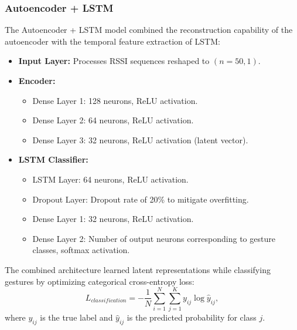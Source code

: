 \documentclass[10pt,twocolumn,letterpaper]{article}
\begin{document}
\subsubsection{Autoencoder + LSTM}
The Autoencoder + LSTM model combined the reconstruction capability of the autoencoder with the temporal feature extraction of LSTM:
\begin{itemize}
    \item \textbf{Input Layer:} Processes RSSI sequences reshaped to \((n=50, 1)\).
    \item \textbf{Encoder:}
        \begin{itemize}
            \item Dense Layer 1: 128 neurons, ReLU activation.
            \item Dense Layer 2: 64 neurons, ReLU activation.
            \item Dense Layer 3: 32 neurons, ReLU activation (latent vector).
        \end{itemize}
    \item \textbf{LSTM Classifier:}
        \begin{itemize}
            \item LSTM Layer: 64 neurons, ReLU activation.
            \item Dropout Layer: Dropout rate of 20\% to mitigate overfitting.
            \item Dense Layer 1: 32 neurons, ReLU activation.
            \item Dense Layer 2: Number of output neurons corresponding to gesture classes, softmax activation.
        \end{itemize}
\end{itemize}

The combined architecture learned latent representations while classifying gestures by optimizing categorical cross-entropy loss:
\begin{equation}
    L_{classification} = -\frac{1}{N} \sum_{i=1}^N \sum_{j=1}^K y_{ij} \log \hat{y}_{ij},
\end{equation}
where \(y_{ij}\) is the true label and \(\hat{y}_{ij}\) is the predicted probability for class \(j\).
\end{document}
